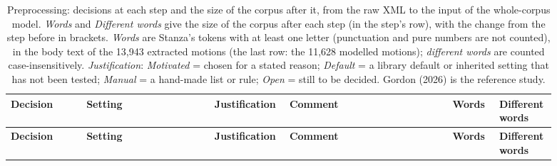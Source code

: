 
\begin{landscape}
{\small
\newcommand{\steprow}[3]{\multicolumn{4}{|l|}{\textbf{#1}} & \textbf{#2} & \textbf{#3} \\}
\renewcommand{\arraystretch}{1.3}
\setlength{\LTcapwidth}{\linewidth}
\begin{longtable}{|>{\raggedright\arraybackslash}p{0.13\linewidth}
                  |>{\raggedright\arraybackslash}p{0.22\linewidth}
                  |>{\raggedright\arraybackslash}p{0.10\linewidth}
                  |>{\raggedright\arraybackslash}p{0.28\linewidth}
                  |>{\raggedleft\arraybackslash}p{0.08\linewidth}
                  |>{\raggedleft\arraybackslash}p{0.08\linewidth}|}
\caption{Preprocessing: decisions at each step and the size of the corpus after it, from the raw XML to the input of the
whole-corpus model. \emph{Words} and \emph{Different words} give the size of the corpus after each step (in the step's
row), with the change from the step before in brackets. \emph{Words} are Stanza's tokens with at least one letter
(punctuation and pure numbers are not counted), in the body text of the 13,943 extracted motions (the last row: the
11,628 modelled motions); \emph{different words} are counted case-insensitively. \emph{Justification}: \emph{Motivated} = chosen for a stated reason; \emph{Default} = a library
default or inherited setting that has not been tested; \emph{Manual} = a hand-made list or rule; \emph{Open} = still to
be decided. Gordon (2026) is the reference study.}
\label{tab:preprocessing} \\
\hline
\textbf{Decision} & \textbf{Setting} & \textbf{Justification} & \textbf{Comment} & \textbf{Words} & \textbf{Different words} \\
\hline
\endfirsthead
\hline
\textbf{Decision} & \textbf{Setting} & \textbf{Justification} & \textbf{Comment} & \textbf{Words} & \textbf{Different words} \\
\hline
\endhead

\end{longtable}}
\end{landscape}

